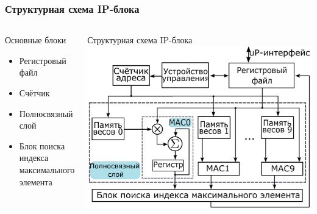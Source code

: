 \begin{frame}[t]
\frametitle{Структурная схема IP-блока}
\begin{columns}
    \begin{block}{\centering Основные блоки}                
        \begin{itemize}\small
            \item Регистровый файл
            \item Счётчик
            \item Полносвязный слой
            \item Блок поиска индекса максимального элемента        
        \end{itemize}
    \end{block}
     
    \begin{block}{\centering Структурная схема IP-блока}
        \vspace{3mm}
        \centering \includegraphics[height = 0.65\textheight]{pics/ip_2.png}
    \end{block}
\end{columns}


\end{frame}


